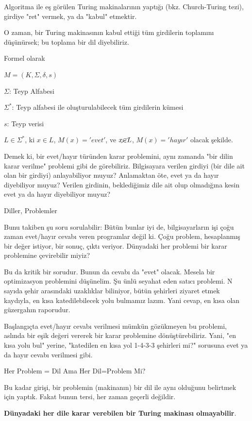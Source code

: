 \documentclass[12pt,fleqn]{article}\usepackage{../../common}
\begin{document}
Algoritma ile eş görülen Turing makinalarının yaptığı (bkz. Church-Turing
tezi), girdiye "ret" vermek, ya da "kabul" etmektir.

O zaman, bir Turing makinasının kabul ettiği tüm girdilerin toplamını
düşünürsek; bu toplama bir dil diyebiliriz.

Formel olarak

$M = (K,\Sigma,\delta,s)$

$\Sigma$: Teyp Alfabesi

$\Sigma^\ast$: Teyp alfabesi ile oluşturulabilecek tüm girdilerin kümesi

$s$: Teyp verisi

$L \in \Sigma^\ast$, ki $x \in L$, $M(x)='evet'$, ve $x \cancel{\in} L$,
$M(x)='hayır'$ olacak şekilde.

Demek ki, bir evet/hayır türünden karar problemini, aynı zamanda "bir dilin
karar verilme" problemi gibi de görebiliriz. Bilgisayara verilen girdiyi
(bir dile ait olan bir girdiyi) anlayabiliyor muyuz? Anlamaktan öte, evet
ya da hayır diyebiliyor muyuz? Verilen girdinin, beklediğimiz dile ait olup
olmadığına kesin evet ya da hayır diyebiliyor muyuz?

Diller, Problemler

Bunu takiben şu soru sorulabilir: Bütün bunlar iyi de, bilgisayarların işi
çoğu zaman evet/hayır cevabı veren programlar değil ki. Çoğu problem,
hesaplanmış bir değer istiyor, bir sonuç, çıktı veriyor. Dünyadaki her
problemi bir karar problemine çevirebilir miyiz?

Bu da kritik bir sorudur. Bunun da cevabı da "evet" olacak. Mesela bir
optimizasyon problemini düşünelim. Şu ünlü seyahat eden satıcı problemi. N
sayıda şehir arasındaki uzaklıklar biliniyor, bütün şehirleri ziyaret etmek
kaydıyla, en kısa katedilebilecek yolu bulmamız lazım. Yani cevap, en kısa
olan güzergahın raporudur.

Başlangıçta evet/hayır cevabı verilmesi mümkün gözükmeyen bu problemi,
aslında bir eşik değeri vererek bir karar problemine
dönüştürebiliriz. Yani, "en kısa yolu bul" yerine, "katedilen en kısa yol
1-4-3-3 şehirleri mi?" sorusuna evet ya da hayır cevabı verilmesi gibi.

Her Problem = Dil Ama Her Dil=Problem Mi?

Bu kadar girişi, bir problemin (makinanın) bir dil ile aynı olduğunu
belirtmek için yaptık. Fakat bunun tersi, her zaman geçerli değildir.

\textbf{Dünyadaki her dile karar verebilen bir Turing makinası olmayabilir}.
\end{document}
